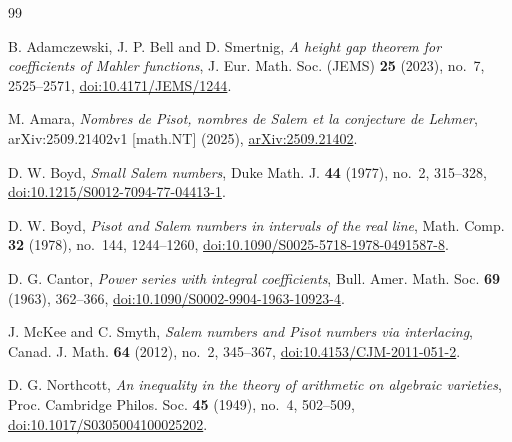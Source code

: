 \documentclass[11pt,reqno]{amsart}
\theoremstyle{definition}
\theoremstyle{remark}
\begin{document}
\begin{thebibliography}{99}

B. Adamczewski, J. P. Bell and D. Smertnig,
\emph{A height gap theorem for coefficients of Mahler functions},
J. Eur. Math. Soc. (JEMS) \textbf{25} (2023), no.~7, 2525--2571,
\href{https://doi.org/10.4171/JEMS/1244}{doi:10.4171/JEMS/1244}.

M. Amara,
\emph{Nombres de Pisot, nombres de Salem et la conjecture de Lehmer},
arXiv:2509.21402v1 [math.NT] (2025),
\href{https://arxiv.org/abs/2509.21402}{arXiv:2509.21402}.

D. W. Boyd,
\emph{Small Salem numbers},
Duke Math. J. \textbf{44} (1977), no.~2, 315--328,
\href{https://doi.org/10.1215/S0012-7094-77-04413-1}
{doi:10.1215/S0012-7094-77-04413-1}.

D. W. Boyd,
\emph{Pisot and Salem numbers in intervals of the real line},
Math. Comp. \textbf{32} (1978), no.~144, 1244--1260,
\href{https://doi.org/10.1090/S0025-5718-1978-0491587-8}
{doi:10.1090/S0025-5718-1978-0491587-8}.

D. G. Cantor,
\emph{Power series with integral coefficients},
Bull. Amer. Math. Soc. \textbf{69} (1963), 362--366,
\href{https://doi.org/10.1090/S0002-9904-1963-10923-4}
{doi:10.1090/S0002-9904-1963-10923-4}.

J. McKee and C. Smyth,
\emph{Salem numbers and Pisot numbers via interlacing},
Canad. J. Math. \textbf{64} (2012), no.~2, 345--367,
\href{https://doi.org/10.4153/CJM-2011-051-2}
{doi:10.4153/CJM-2011-051-2}.

D. G. Northcott,
\emph{An inequality in the theory of arithmetic on algebraic varieties},
Proc. Cambridge Philos. Soc. \textbf{45} (1949), no.~4, 502--509,
\href{https://doi.org/10.1017/S0305004100025202}
{doi:10.1017/S0305004100025202}.

\end{thebibliography}
\end{document}
